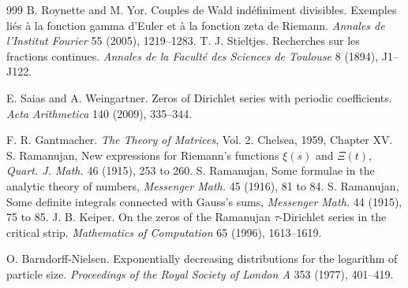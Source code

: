 \begin{thebibliography}{999}
 B. Roynette and M. Yor. Couples de Wald ind\'efiniment divisibles. Exemples li\'es \`a la fonction gamma d'Euler et \`a la fonction zeta de Riemann. \emph{Annales de l'Institut Fourier} 55 (2005), 1219--1283.
 T. J. Stieltjes. Recherches sur les fractions continues. \emph{Annales de la Facult\'e des Sciences de Toulouse} 8 (1894), J1--J122.

 E. Saias and A. Weingartner. Zeros of Dirichlet series with periodic coefficients. \emph{Acta Arithmetica} 140 (2009), 335--344.

 F. R. Gantmacher. \emph{The Theory of Matrices}, Vol. 2. Chelsea, 1959, Chapter XV.
 S. Ramanujan, New expressions for Riemann's functions $\xi(s)$ and $\Xi(t)$, \emph{Quart. J. Math.} 46 (1915), 253 to 260.
 S. Ramanujan, Some formulae in the analytic theory of numbers, \emph{Messenger Math.} 45 (1916), 81 to 84.
 S. Ramanujan, Some definite integrals connected with Gauss's sums, \emph{Messenger Math.} 44 (1915), 75 to 85.
 J. B. Keiper. On the zeros of the Ramanujan $\tau$-Dirichlet series in the critical strip. \emph{Mathematics of Computation} 65 (1996), 1613--1619.

 O. Barndorff-Nielsen. Exponentially decreasing distributions for the logarithm of particle size. \emph{Proceedings of the Royal Society of London A} 353 (1977), 401--419.


\end{thebibliography}

